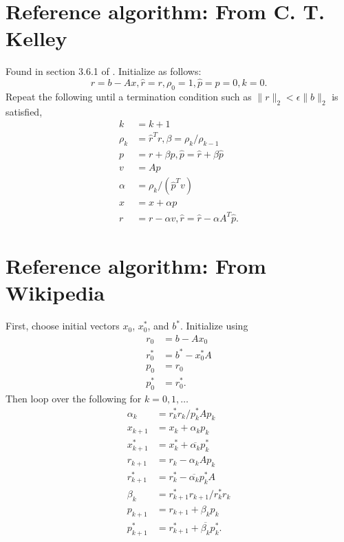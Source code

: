 \documentclass{article}
\begin{document}
\appendix
\section{Reference algorithm: From C. T. Kelley}
Found in section 3.6.1 of \cite{kelley}.
Initialize as follows:
\begin{equation}
r = b - Ax, \hat{r} = r, \rho_0 = 1, \hat{p} = p = 0, k = 0.
\end{equation}
Repeat the following until a termination condition 
    such as $\|r\|_2 < \epsilon \|b\|_2$ is satisfied,
    \begin{subequations}\begin{align}
    k &= k + 1 \\
    \rho_k &= \hat{r}^T r, \beta = \rho_k / \rho_{k-1} \\
    p &= r + \beta p, \hat{p} = \hat{r} + \beta \hat{p} \\
    v &= Ap \\
    \alpha &= \rho_k / (\hat{p}^T v) \\
    x &= x + \alpha p \\
    r &= r - \alpha v, \hat{r} = \hat{r} - \alpha A^T \hat{p}.
    \end{align}\end{subequations}

\section{Reference algorithm: From Wikipedia}
First, choose initial vectors $x_0$, $x_0^\ast$, and $b^\ast$.
Initialize using
    \begin{subequations}\begin{align}
    r_0 &= b - Ax_0 \\
    r_0^\ast &= b^\ast - x_0^\ast A \\
    p_0 &= r_0 \\
    p_0^\ast &= r_0^\ast.
    \end{align}\end{subequations}
Then loop over the following for $k = 0, 1, \ldots$
    \begin{subequations}\begin{align}
    \alpha_k &= r_k^\ast r_k / p_k^\ast A p_k \\
    x_{k+1} &= x_k + \alpha_k p_k \\
    x_{k+1}^\ast &= x_k^\ast + \overline{\alpha_k} p_k^\ast \\
    r_{k+1} &= r_k - \alpha_k A p_k \\
    r_{k+1}^\ast &= r_k^\ast - \overline{\alpha_k} p_k^\ast A \\
    \beta_k &= r_{k+1}^\ast r_{k+1} / r_k^\ast r_k \\
    p_{k+1} &= r_{k+1} + \beta_k p_k \\
    p_{k+1}^\ast &= r_{k+1}^\ast + \overline{\beta_k} p_k^\ast.
    \end{align}\end{subequations}
\end{document}
